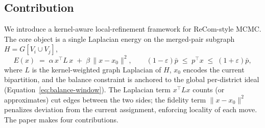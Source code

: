 \documentclass[11pt]{article}
\begin{document}
\subsection{Contribution}\label{sec:intro-contribution}

We introduce a kernel-aware local-refinement framework for ReCom-style
MCMC. The core object is a single Laplacian energy on the merged-pair
subgraph $H = G[V_i \cup V_j]$,
\begin{equation}\label{eq:core-energy}
  E(x) \;=\; \alpha\, x^\top L\, x \;+\; \beta\, \|x - x_0\|^2,
  \qquad
  (1 - \varepsilon)\bar p \;\le\; p^\top x \;\le\; (1+\varepsilon)\bar p,
\end{equation}
where $L$ is the kernel-weighted graph Laplacian of $H$, $x_0$ encodes
the current bipartition, and the balance constraint is anchored to the
global per-district ideal (Equation~\eqref{eq:balance-window}). The
Laplacian term $x^\top L x$ counts (or approximates) cut edges between
the two sides; the fidelity term $\|x - x_0\|^2$ penalizes deviation
from the current assignment, enforcing locality of each move. The
paper makes four contributions.
\end{document}
